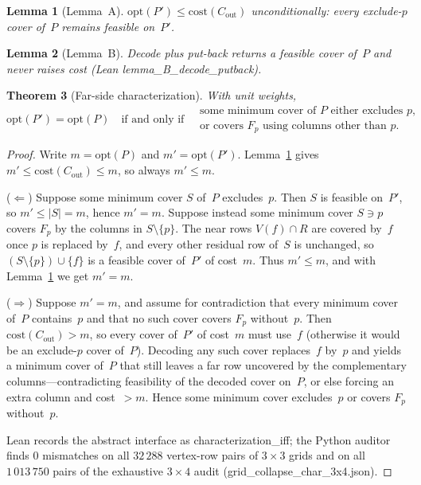 \documentclass[11pt]{article}
\newtheorem{theorem}{Theorem}
\newtheorem{lemma}[theorem]{Lemma}
\begin{document}
\begin{lemma}[Lemma~A]
\label{lem:A}
$\mathrm{opt}(P')\le\mathrm{cost}(C_{\mathrm{out}})$ unconditionally: every
exclude-$p$ cover of~$P$ remains feasible on~$P'$.
\end{lemma}

\begin{lemma}[Lemma~B]
\label{lem:B}
Decode plus put-back returns a feasible cover of~$P$ and never raises cost
(Lean \textsf{lemma\_B\_decode\_putback}).
\end{lemma}

\begin{theorem}[Far-side characterization]
\label{thm:far-side}
With unit weights,
\[
\mathrm{opt}(P')=\mathrm{opt}(P)
\quad\text{if and only if}\quad
\begin{array}{l}
\text{some minimum cover of~$P$ either excludes~$p$,}\\
\text{or covers~$F_p$ using columns other than~$p$.}
\end{array}
\]
\end{theorem}

\begin{proof}
Write $m=\mathrm{opt}(P)$ and $m'=\mathrm{opt}(P')$.
Lemma~\ref{lem:A} gives $m'\le\mathrm{cost}(C_{\mathrm{out}})\le m$, so always $m'\le m$.

($\Leftarrow$) Suppose some minimum cover $S$ of~$P$ excludes~$p$.  Then $S$ is
feasible on~$P'$, so $m'\le|S|=m$, hence $m'=m$.
Suppose instead some minimum cover $S\ni p$ covers $F_p$ by the columns in
$S\setminus\{p\}$.  The near rows $V(f)\cap R$ are covered by~$f$ once $p$ is
replaced by~$f$, and every other residual row of~$S$ is unchanged, so
$(S\setminus\{p\})\cup\{f\}$ is a feasible cover of~$P'$ of cost~$m$.  Thus
$m'\le m$, and with Lemma~\ref{lem:A} we get $m'=m$.

($\Rightarrow$) Suppose $m'=m$, and assume for contradiction that every minimum
cover of~$P$ contains~$p$ and that no such cover covers $F_p$ without~$p$.
Then $\mathrm{cost}(C_{\mathrm{out}})>m$, so every cover of~$P'$ of cost~$m$ must
use~$f$ (otherwise it would be an exclude-$p$ cover of~$P$).  Decoding any such
cover replaces~$f$ by~$p$ and yields a minimum cover of~$P$ that still leaves a
far row uncovered by the complementary columns---contradicting feasibility of the
decoded cover on~$P$, or else forcing an extra column and cost~$>m$.  Hence some
minimum cover excludes~$p$ or covers $F_p$ without~$p$.

Lean records the abstract interface as \textsf{characterization\_iff}; the
Python auditor finds $0$ mismatches on all $32\,288$ vertex-row pairs of
$3\times 3$ grids and on all $1\,013\,750$ pairs of the exhaustive $3\times 4$
audit (\textsf{grid\_collapse\_char\_3x4.json}).
\end{proof}
\end{document}
